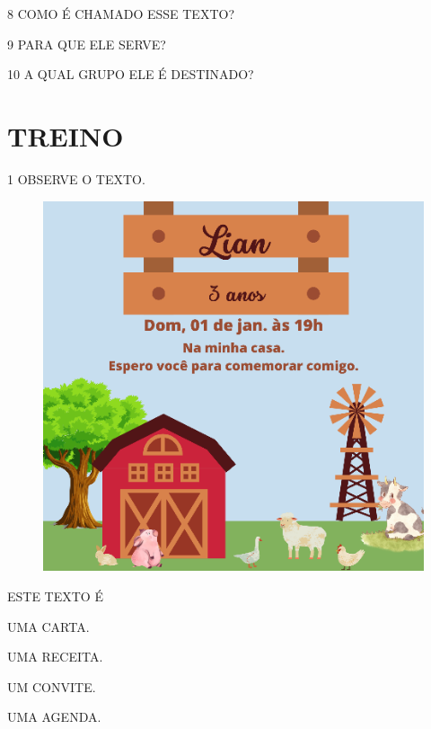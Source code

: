
\num{8} COMO É CHAMADO ESSE TEXTO?



\num{9} PARA QUE ELE SERVE?


\num{10} A QUAL GRUPO ELE É DESTINADO?


\pagebreak
\section{TREINO}


\num{1} OBSERVE O TEXTO.

\begin{figure}[htpb!]
\centering
\includegraphics[width=.9\textwidth]{media/image157.png}
\end{figure}

ESTE TEXTO É

\begin{escolha}
\item UMA CARTA.

\item UMA RECEITA.

\item UM CONVITE.

\item UMA AGENDA.
\end{escolha}

